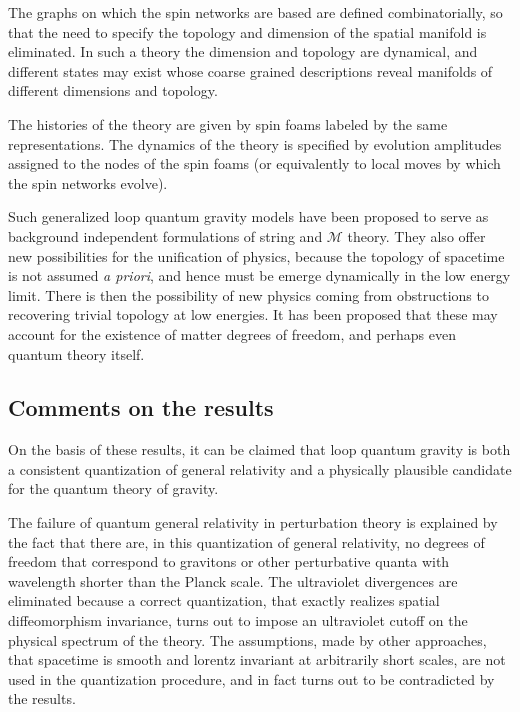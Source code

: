 \documentclass[12pt]{article}
\begin{document}
  The graphs on which the spin networks are based are defined combinatorially,
  so that the
  need to specify
  the topology and dimension of the spatial manifold is
  eliminated\cite{F-foam,tubes}.
  In such a theory the dimension and topology are dynamical,
  and different states may exist whose coarse grained descriptions
  reveal manifolds of different dimensions and topology.

  The histories of the
  theory are given by spin foams labeled by the same representations.
  The dynamics of the theory is specified by evolution
  amplitudes assigned to the nodes of the spin foams (or equivalently
  to local moves by which the spin networks evolve).

  Such generalized loop quantum gravity models have been proposed to 
  serve as background independent formulations of string and $\mathcal M$ 
  theory\cite{stringnets,tubes}.  They also offer new possibilities 
  for the unification of physics, because the topology of spacetime is not
  assumed {\it a priori}, and hence must be emerge dynamically in the low 
  energy limit. There is then the possibility of new physics coming 
  from obstructions to recovering trivial topology at low energies. 
  It has been proposed that these may account for the existence of 
  matter degrees of freedom\cite{louis-matter,unify}, and perhaps even quantum 
  theory itself\cite{hidden-graphs}.

  
 \subsection{Comments on the results}

  On the basis of these results, it can be claimed that loop quantum
  gravity is both a consistent quantization of general relativity
and a physically plausible candidate for the quantum theory of gravity.

  The failure of quantum general relativity in perturbation theory is
  explained by the fact that there are, in this quantization of
  general relativity, no degrees of freedom that correspond to
  gravitons or other perturbative quanta with wavelength shorter than
  the Planck scale.  The ultraviolet divergences are eliminated
  because a correct quantization, that exactly realizes spatial
  diffeomorphism invariance, turns out to impose an ultraviolet cutoff
  on the physical spectrum of the theory.  The assumptions,  made by other approaches, 
   that spacetime is smooth and lorentz invariant 
  at arbitrarily short
  scales, are not used in the quantization procedure, and 
  in fact turns out to
  be contradicted by the results.
\end{document}
